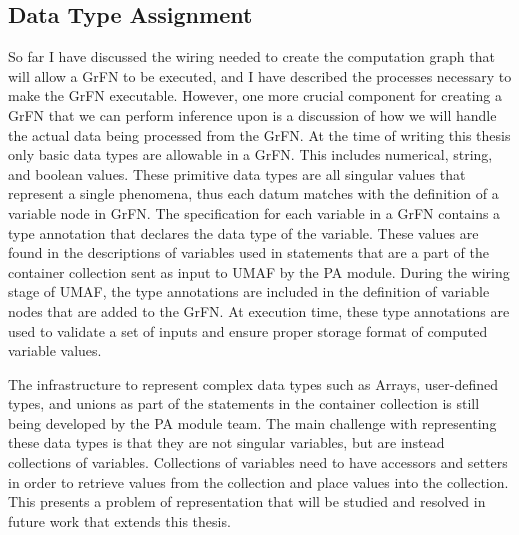 \subsection{Data Type Assignment\label{sec:data_type_assg}}
So far I have discussed the wiring needed to create the computation graph that will allow a GrFN to be executed, and I have described the processes necessary to make the GrFN executable.
However, one more crucial component for creating a GrFN that we can perform inference upon is a discussion of how we will handle the actual data being processed from the GrFN.
At the time of writing this thesis only basic data types are allowable in a GrFN.
This includes numerical, string, and boolean values.
These primitive data types are all singular values that represent a single phenomena, thus each datum matches with the definition of a variable node in GrFN.
The specification for each variable in a GrFN contains a type annotation that declares the data type of the variable.
These values are found in the descriptions of variables used in statements that are a part of the container collection sent as input to UMAF by the PA module.
During the wiring stage of UMAF, the type annotations are included in the definition of variable nodes that are added to the GrFN.
At execution time, these type annotations are used to validate a set of inputs and ensure proper storage format of computed variable values.

The infrastructure to represent complex data types such as Arrays, user-defined types, and unions as part of the statements in the container collection is still being developed by the PA module team.
The main challenge with representing these data types is that they are not singular variables, but are instead collections of variables.
Collections of variables need to have accessors and setters in order to retrieve values from the collection and place values into the collection.
This presents a problem of representation that will be studied and resolved in future work that extends this thesis.

